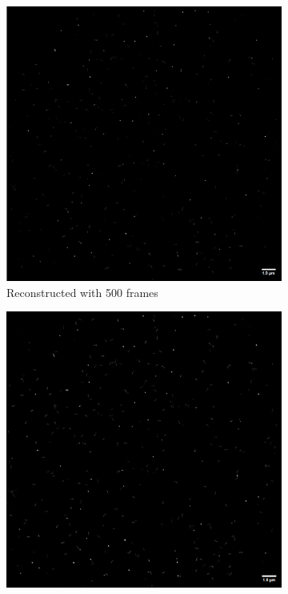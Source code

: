 \documentclass[a4paper,english,12pt,bibliography=totoc]{scrreprt}
\begin{document}
 \begin{figure}[H]
    \centering
    \begin{subfigure}[b]{0.49\textwidth}
        \centering
        \includegraphics[width=\textwidth]{Images/PAINT/500frames.png}
        \caption{Reconstructed with 500 frames}
        \label{fig:image1}
    \end{subfigure}
    \hfill
    \begin{subfigure}[b]{0.49\textwidth}
        \centering
        \includegraphics[width=\textwidth]{Images/PAINT/2000frames.png}

\end{subfigure}
\end{figure}
\end{document}
